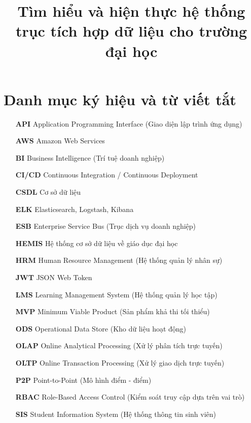 \documentclass[twoside,final]{hcmut-report}
\title{Tìm hiểu và hiện thực hệ thống trục tích hợp dữ liệu cho trường đại học}
\begin{document}
\coverpage%



\tableofcontents
\listoffigures
\listoftables

\clearpage
\chapter*{Danh mục ký hiệu và từ viết tắt}

\begin{itemize}[leftmargin=3cm, labelsep=1cm]
    \item[\textbf{API}] Application Programming Interface (Giao diện lập trình ứng dụng)
    \item[\textbf{AWS}] Amazon Web Services
    \item[\textbf{BI}] Business Intelligence (Trí tuệ doanh nghiệp)
    \item[\textbf{CI/CD}] Continuous Integration / Continuous Deployment
    \item[\textbf{CSDL}] Cơ sở dữ liệu
    \item[\textbf{ELK}] Elasticsearch, Logstash, Kibana
    \item[\textbf{ESB}] Enterprise Service Bus (Trục dịch vụ doanh nghiệp)
    \item[\textbf{HEMIS}] Hệ thống cơ sở dữ liệu về giáo dục đại học 
    \item[\textbf{HRM}] Human Resource Management (Hệ thống quản lý nhân sự)
    \item[\textbf{JWT}] JSON Web Token
    \item[\textbf{LMS}] Learning Management System (Hệ thống quản lý học tập)
    \item[\textbf{MVP}] Minimum Viable Product (Sản phẩm khả thi tối thiểu)
    \item[\textbf{ODS}] Operational Data Store (Kho dữ liệu hoạt động)
    \item[\textbf{OLAP}] Online Analytical Processing (Xử lý phân tích trực tuyến)
    \item[\textbf{OLTP}] Online Transaction Processing (Xử lý giao dịch trực tuyến)
    \item[\textbf{P2P}] Point-to-Point (Mô hình điểm - điểm)
    \item[\textbf{RBAC}] Role-Based Access Control (Kiểm soát truy cập dựa trên vai trò)
    \item[\textbf{SIS}] Student Information System (Hệ thống thông tin sinh viên)
\end{itemize}
\clearpage

\clearpage








\clearpage



\nocite{*}
\end{document}
